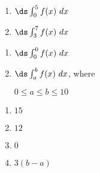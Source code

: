 {\noindent
\begin{minipage}{\linewidth}
\end{minipage}
\noindent\begin{minipage}[t]{.5\linewidth}
\begin{enumerate}
\item		$\ds \int_0^5 f(x)\ dx$
\item		$\ds \int_3^7 f(x)\ dx$
\end{enumerate}
\end{minipage}
\begin{minipage}[t]{.5\linewidth}
\begin{enumerate}\addtocounter{enumii}{2}
\item		$\ds \int_0^0 f(x)\ dx$
\item		$\ds \int_a^b f(x)\ dx$, where 

$0\leq a\leq b\leq 10$
\end{enumerate}
\end{minipage}
}
{\begin{enumerate}
\item		$15$
\item		$12$
\item		$0$
\item		$3(b-a)$
\end{enumerate}
}

